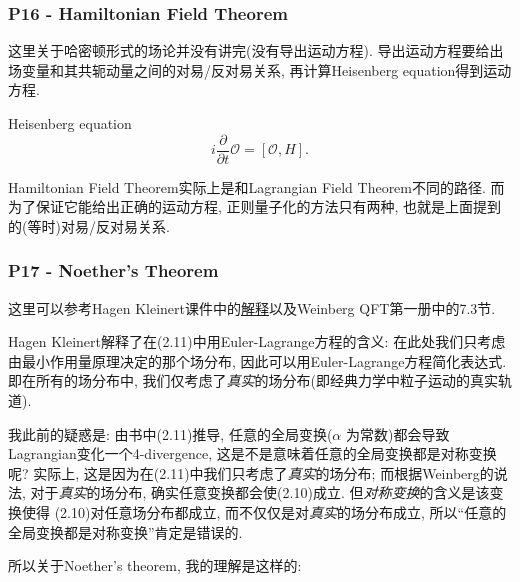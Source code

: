 \documentclass[cn,hazy,green,11pt,device=normal,chinesefont=founder]{elegantnote}
\begin{document}
\subsubsection{P16 - Hamiltonian Field Theorem}

这里关于哈密顿形式的场论并没有讲完(没有导出运动方程). 导出运动方程要给出场变量和其共轭动量之间的对易/反对易关系, 再计算Heisenberg equation得到运动方程. 

\begin{note}
  Heisenberg equation
  \begin{equation}
    i\frac{\partial}{\partial t}\mathcal{O} = [\mathcal{O}, H].
  \end{equation}
\end{note}

Hamiltonian Field Theorem实际上是和Lagrangian Field Theorem不同的路径. 而为了保证它能给出正确的运动方程, 正则量子化的方法只有两种, 也就是上面提到的(等时)对易/反对易关系. 

\subsubsection{P17 - Noether's Theorem}

这里可以参考Hagen Kleinert课件中的\href{http://users.physik.fu-berlin.de/~kleinert/b6/psfiles/Chapter-7-conslaw.pdf}{解释}以及Weinberg QFT第一册中的7.3节. 

Hagen Kleinert解释了在(2.11)中用Euler-Lagrange方程的含义: 在此处我们只考虑由最小作用量原理决定的那个场分布, 因此可以用Euler-Lagrange方程简化表达式. 即在所有的场分布中, 我们仅考虑了\textit{真实}的场分布(即经典力学中粒子运动的真实轨道). 

我此前的疑惑是: 由书中(2.11)推导, 任意的全局变换($\alpha$ 为常数)都会导致Lagrangian变化一个4-divergence, 这是不是意味着任意的全局变换都是对称变换呢? 实际上, 这是因为在(2.11)中我们只考虑了\textit{真实}的场分布; 而根据Weinberg的说法, 对于\textit{真实}的场分布, 确实任意变换都会使(2.10)成立. 但\textit{对称变换}的含义是该变换使得 (2.10)对任意场分布都成立, 而不仅仅是对\textit{真实}的场分布成立, 所以“任意的全局变换都是对称变换”肯定是错误的. 

所以关于Noether's theorem, 我的理解是这样的: 
\end{document}
